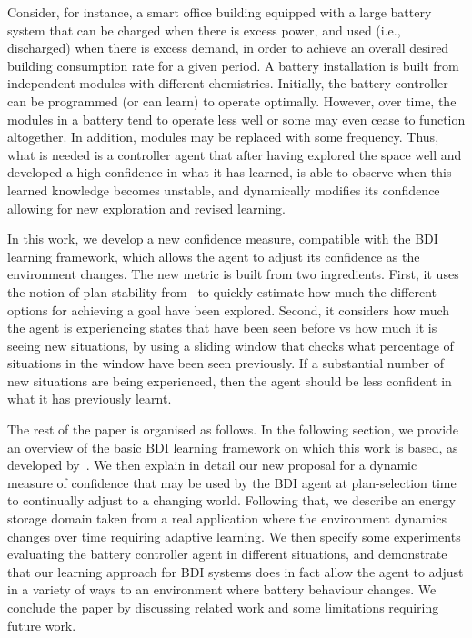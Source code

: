 Consider, for instance, a smart office building equipped with a large battery system that can be charged when there is excess power, and used (i.e., discharged) when there is excess demand, in order to achieve an overall desired building consumption rate for a given period. A battery installation is built from independent modules with different chemistries. Initially, the battery controller can be programmed (or can learn) to operate optimally. However, over time, the modules in a battery tend to operate less well or some may even cease to function altogether. In addition, modules may be replaced with some frequency.  
Thus, what is needed is a controller agent that after having explored the space well and developed a high confidence in what it has learned, is able to observe when this learned knowledge becomes unstable, and dynamically modifies its confidence allowing for new exploration and revised learning.

In this work, we develop a new confidence measure, compatible with the BDI learning framework, which allows the agent to adjust its confidence as the environment changes.
The new metric is built from two ingredients.
First, it uses the notion of plan stability from~\cite{airiau09:enhancing,singh10:learning} to quickly estimate how much the different options for achieving a goal have been explored.
Second, it considers how much the agent is experiencing states that have been seen before vs how much it is seeing new situations, by using a sliding window that checks what percentage of situations in the window have been seen previously. If a substantial number of new situations are being experienced, then the agent should be less confident in what it has previously learnt. 

The rest of the paper is organised as follows.
In the following section, we provide an overview of the basic BDI learning framework on which this work is based, as developed by~\cite{airiau09:enhancing,singh10:extending,singh10:learning}. 
We then explain in detail our new proposal for a dynamic measure of confidence that may be used by the BDI agent at plan-selection time to continually adjust to a changing world. 
Following that, we describe an energy storage domain taken from a real application where the environment dynamics changes over time requiring adaptive learning. We then specify some experiments evaluating the battery controller agent in different situations, and demonstrate that our learning approach for BDI systems does in fact allow the agent to adjust in a variety of ways to an environment where battery behaviour changes. 
We conclude the paper by discussing related work and some limitations requiring future work.


